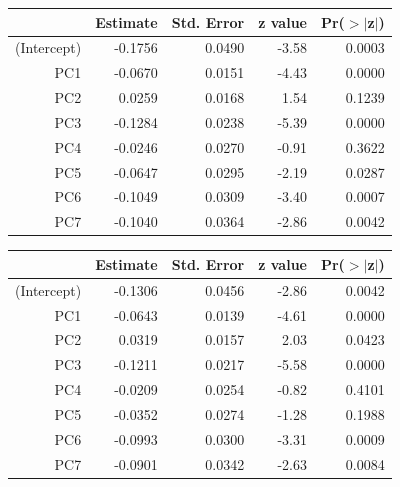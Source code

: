 \documentclass[a4paper,12pt]{Latex/Classes/PhDthesisPSnPDF}
\begin{document}
\begin{center}
\begin{table}[ht]
\centering
\begin{tabular}{rrrrr}
  \hline
 & Estimate & Std. Error & z value & Pr($>$$|$z$|$) \\ 
  \hline
(Intercept) & -0.1756 & 0.0490 & -3.58 & 0.0003 \\ 
  PC1 & -0.0670 & 0.0151 & -4.43 & 0.0000 \\ 
  PC2 & 0.0259 & 0.0168 & 1.54 & 0.1239 \\ 
  PC3 & -0.1284 & 0.0238 & -5.39 & 0.0000 \\ 
  PC4 & -0.0246 & 0.0270 & -0.91 & 0.3622 \\ 
  PC5 & -0.0647 & 0.0295 & -2.19 & 0.0287 \\ 
  PC6 & -0.1049 & 0.0309 & -3.40 & 0.0007 \\ 
  PC7 & -0.1040 & 0.0364 & -2.86 & 0.0042 \\ 
   \hline
\end{tabular}
\end{table}\end{center}
\newpage
\begin{center}
\begin{table}[ht]
\centering
\begin{tabular}{rrrrr}
  \hline
 & Estimate & Std. Error & z value & Pr($>$$|$z$|$) \\ 
  \hline
(Intercept) & -0.1306 & 0.0456 & -2.86 & 0.0042 \\ 
  PC1 & -0.0643 & 0.0139 & -4.61 & 0.0000 \\ 
  PC2 & 0.0319 & 0.0157 & 2.03 & 0.0423 \\ 
  PC3 & -0.1211 & 0.0217 & -5.58 & 0.0000 \\ 
  PC4 & -0.0209 & 0.0254 & -0.82 & 0.4101 \\ 
  PC5 & -0.0352 & 0.0274 & -1.28 & 0.1988 \\ 
  PC6 & -0.0993 & 0.0300 & -3.31 & 0.0009 \\ 
  PC7 & -0.0901 & 0.0342 & -2.63 & 0.0084 \\ 
   \hline
\end{tabular}
\end{table}\end{center}
\end{document}
